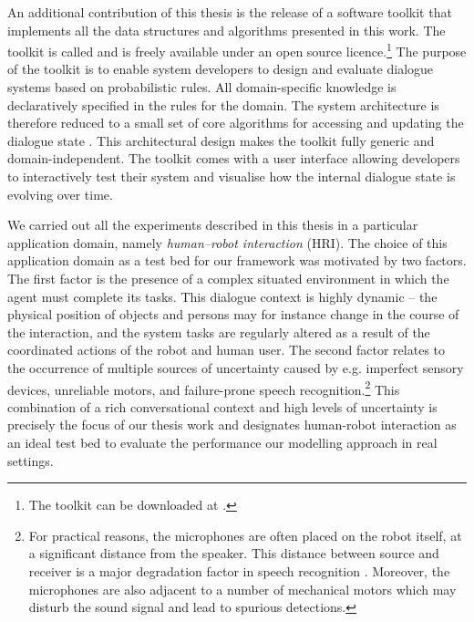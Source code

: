 An additional contribution of this thesis is the release of a software toolkit that implements all the data structures and algorithms presented in this work. The toolkit is called \opendial  and is freely available under an open source licence.\footnote{The toolkit can be downloaded at . } The purpose of the toolkit is to enable system developers to design and evaluate dialogue systems based on probabilistic rules. All domain-specific knowledge is declaratively specified in the rules for the domain. The system architecture is therefore reduced to a small set of core algorithms for accessing and updating the dialogue state \citep{lison-semdial2012}. This architectural design makes the toolkit fully generic and domain-independent. The \opendial toolkit comes with a user interface allowing developers to interactively test their system and visualise how the internal dialogue state is evolving over time.  %

We carried out all the experiments described in this thesis in a particular application domain, namely \textit{human--robot interaction}  (HRI).  The choice of this application domain as a test bed for our framework was motivated by two factors.  The first factor is the presence of a complex situated environment in which the agent must complete its tasks.  This dialogue context is highly dynamic -- the physical position of objects and persons may for instance change in the course of the interaction, and the system tasks are regularly altered as a result of the coordinated actions of the robot and human user. The second factor relates to the occurrence of multiple sources of uncertainty caused by e.g. imperfect sensory devices, unreliable motors, and failure-prone speech recognition.\footnote{For practical reasons, the microphones are often placed on the robot itself, at a significant distance from the speaker.  This distance between source and receiver is a major degradation factor in speech recognition \citep{wolfel2009distant}.  Moreover, the microphones are also adjacent to a number of mechanical motors which may disturb the sound signal and lead to spurious detections.} This combination of a rich conversational context and high levels of uncertainty is precisely the focus of our thesis work and designates human-robot interaction as an ideal test bed to evaluate the performance our modelling approach in real settings.

